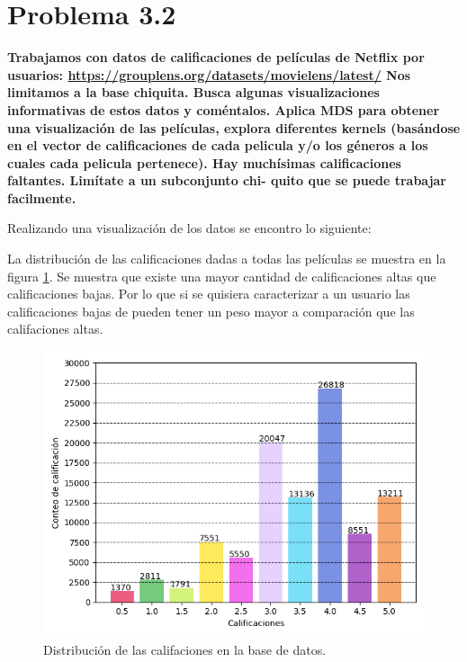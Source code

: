 \section*{Problema 3.2}

\textbf{Trabajamos con datos de calificaciones de películas de Netflix por usuarios: \url{https://grouplens.org/datasets/movielens/latest/} Nos limitamos a la base chiquita. Busca algunas visualizaciones informativas de estos datos y coméntalos. Aplica MDS para obtener una visualización de las películas, explora diferentes kernels (basándose en el vector de calificaciones de cada pelicula y/o los géneros a los cuales cada pelicula pertenece). Hay muchísimas calificaciones faltantes. Limítate a un subconjunto chi- quito que se puede trabajar facilmente.}

Realizando una visualización de los datos se encontro lo siguiente:

La distribución de las calificaciones dadas a todas las películas se muestra en la figura \ref{fig:histogram_rating}. Se muestra que existe una mayor cantidad de calificaciones altas que calificaciones bajas. Por lo que si se quisiera caracterizar a un usuario las calificaciones bajas de pueden tener un peso mayor a comparación que las califaciones altas.

\begin{figure}[H]
    \centering
    \includegraphics[width=14cm]{Graphics/Problema_3_2/Histogram_rating.png}
    \caption{Distribución de las califaciones en la base de datos.}
    \label{fig:histogram_rating}
\end{figure}


